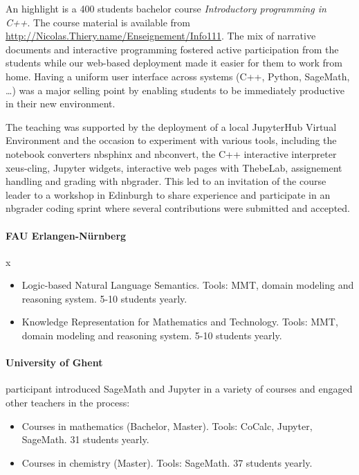 \documentclass{deliverablereport}
\begin{document}
  An highlight is a 400 students bachelor course \emph{Introductory
    programming in C++}. The course material is available from
  \url{http://Nicolas.Thiery.name/Enseignement/Info111}. The mix of
  narrative documents and interactive programming fostered active
  participation from the students while our web-based deployment made
  it easier for them to work from home. Having a uniform user
  interface across systems (C++, Python, SageMath, \ldots) was a major
  selling point by enabling students to be immediately productive in
  their new environment.

  The teaching was supported by the deployment of a local JupyterHub
  Virtual Environment and the occasion to experiment with various
  tools, including the notebook converters nbsphinx and nbconvert, the
  C++ interactive interpreter xeus-cling, Jupyter widgets, interactive
  web pages with ThebeLab, assignement handling and grading with
  nbgrader. This led to an invitation of the course leader to a
  workshop in Edinburgh to share experience and participate in an
  nbgrader coding sprint where several contributions were submitted
  and accepted.

\paragraph{FAU Erlangen-Nürnberg}x
  \begin{itemize}
  \item Logic-based Natural Language Semantics. Tools: MMT, domain
    modeling and reasoning system. 5-10 students yearly.
  \item Knowledge Representation for Mathematics and Technology.
    Tools: MMT, domain modeling and reasoning system.
    5-10 students yearly.
 \end{itemize}

\paragraph{University of Ghent}
  \ODK participant introduced SageMath and Jupyter in a variety of
  courses and engaged other teachers in the process:
  \begin{itemize}
  \item Courses in mathematics (Bachelor, Master). Tools: CoCalc,
    Jupyter, SageMath. 31 students yearly.
  \item Courses in chemistry (Master). Tools: SageMath. 37 students
    yearly.
  \end{itemize}
\end{document}

